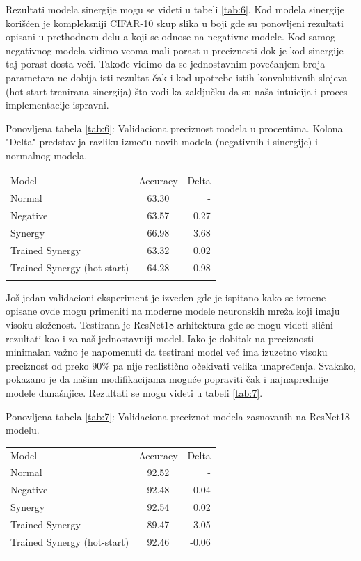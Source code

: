 Rezultati modela sinergije mogu se videti u tabeli \ref{tab:6}. Kod modela sinergije korišćen je kompleksniji CIFAR-10 skup slika u boji gde su ponovljeni rezultati opisani u prethodnom delu a koji se odnose na negativne modele. Kod samog negativnog modela vidimo veoma mali porast u preciznosti dok je kod sinergije taj porast dosta veći. Takođe vidimo da se jednostavnim povećanjem broja parametara ne dobija isti rezultat čak i kod upotrebe istih konvolutivnih slojeva (hot-start trenirana sinergija) što vodi ka zaključku da su naša intuicija i proces implementacije ispravni.

\begin{table}
\centering
{Ponovljena tabela \ref{tab:6}: Validaciona preciznost modela u procentima. Kolona "Delta" predstavlja razliku između novih modela (negativnih i sinergije) i normalnog modela. \vskip 0cm}
\begin{tabular}{lcr}
\hline\noalign{\smallskip}
Model & Accuracy & Delta\\
\noalign{\smallskip}\hline\noalign{\smallskip}
Normal & 63.30 & - \\
Negative & 63.57 & 0.27 \\
Synergy & 66.98 & 3.68 \\
Trained Synergy & 63.32 & 0.02 \\
Trained Synergy (hot-start) & 64.28 & 0.98 \\
\noalign{\smallskip}\hline
\end{tabular}
\end{table}

Još jedan validacioni eksperiment je izveden gde je ispitano kako se izmene opisane ovde mogu primeniti na moderne modele neuronskih mreža koji imaju visoku složenost. Testirana je ResNet18 \cite{he2016deep} arhitektura gde se mogu videti slični rezultati kao i za naš jednostavniji model. Iako je dobitak na preciznosti minimalan važno je napomenuti da testirani model već ima izuzetno visoku preciznost od preko $90\%$ pa nije realistično očekivati velika unapređenja. Svakako, pokazano je da našim modifikacijama moguće popraviti čak i najnaprednije modele današnjice. Rezultati se mogu videti u tabeli \ref{tab:7}.

\begin{table}
\centering
{Ponovljena tabela \ref{tab:7}: Validaciona preciznot modela zasnovanih na ResNet18 modelu.}
\vskip 1mm
\begin{tabular}{lcr}
\hline\noalign{\smallskip}
Model & Accuracy & Delta\\
\noalign{\smallskip}\hline\noalign{\smallskip}
Normal & 92.52 & - \\
Negative & 92.48 & -0.04 \\
Synergy & 92.54 & 0.02 \\
Trained Synergy & 89.47 & -3.05 \\
Trained Synergy (hot-start) & 92.46 & -0.06 \\
\noalign{\smallskip}\hline
\end{tabular}
\end{table}

